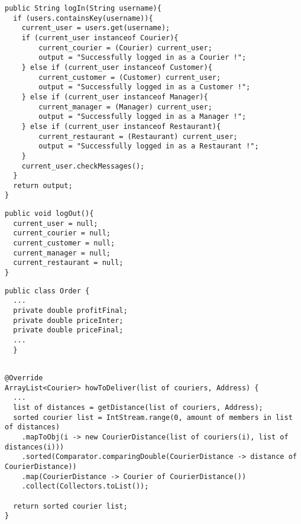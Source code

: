 \begin{lstlisting}[caption=the main methods for the log in log out system.,
  label=lst:login]
public String logIn(String username){
  if (users.containsKey(username)){
    current_user = users.get(username);
    if (current_user instanceof Courier){
    	current_courier = (Courier) current_user;
    	output = "Successfully logged in as a Courier !";
    } else if (current_user instanceof Customer){
    	current_customer = (Customer) current_user;
    	output = "Successfully logged in as a Customer !";
    } else if (current_user instanceof Manager){
    	current_manager = (Manager) current_user;
    	output = "Successfully logged in as a Manager !";
    } else if (current_user instanceof Restaurant){
    	current_restaurant = (Restaurant) current_user;
    	output = "Successfully logged in as a Restaurant !";
    }
    current_user.checkMessages(); 
  }
  return output;
}
\end{lstlisting}

\begin{lstlisting}[caption=the main methods for the log in log out system.,
  label=lst:logout]
public void logOut(){
  current_user = null;
  current_courier = null;
  current_customer = null;
  current_manager = null;
  current_restaurant = null;
}
\end{lstlisting}



\begin{lstlisting}[caption=Implementation of different price quantities in \texttt{Order}.,
  label=lst:prices_order]
public class Order {
  ...
  private double profitFinal;
  private double priceInter;
  private double priceFinal;
  ...
  }
\end{lstlisting}

 \begin{lstlisting}[caption=Pseudo java code of  fastest delivery method.,
   label=lst:fast_deliv_meth] 

@Override
ArrayList<Courier> howToDeliver(list of couriers, Address) {
  ...
  list of distances = getDistance(list of couriers, Address);	
  sorted courier list = IntStream.range(0, amount of members in list of distances)
    .mapToObj(i -> new CourierDistance(list of couriers(i), list of distances(i)))
    .sorted(Comparator.comparingDouble(CourierDistance -> distance of CourierDistance))
    .map(CourierDistance -> Courier of CourierDistance())
    .collect(Collectors.toList());
  		
  return sorted courier list;
}
  
\end{lstlisting}

